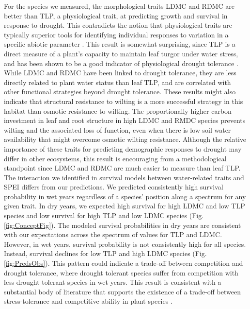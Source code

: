 \documentclass[12pt, letterpaper]{article}
\begin{document}
For the species we measured, the morphological traits LDMC and RDMC are better than TLP, a physiological trait, at predicting growth and survival in response to drought. This contradicts the notion that physiological traits are typically superior tools for identifying individual responses to variation in a specific abiotic parameter \citep{Volaire2018}. This result is somewhat surprising, since TLP is a direct measure of a plant's capacity to maintain leaf turgor under water stress, and has been shown to be a good indicator of physiological drought tolerance \citep{Bartlett2012}. While LDMC and RDMC have been linked to drought tolerance, they are less directly related to plant water status than leaf TLP, and are correlated with other functional strategies beyond drought tolerance. These results might also indicate that structural resistance to wilting is a more successful strategy in this habitat than osmotic resistance to wilting. The proportionally higher carbon investment in leaf and root structure in high LDMC and RMDC species prevents wilting and the associated loss of function, even when there is low soil water availability that might overcome osmotic wilting resistance. Although the relative importance of these traits for predicting demographic responses to drought may differ in other ecosystems, this result is encouraging from a methodological standpoint since LDMC and RDMC are much easier to measure than leaf TLP.
The interaction we identified in survival models between water-related traits and SPEI differs from our predictions. We predicted consistently high survival probability in wet years regardless of a species’ position along a spectrum for any given trait. In dry years, we expected high survival for high LDMC and low TLP species and low survival for high TLP and low LDMC species (Fig. \ref{fig:ConceptFig}). The modeled survival probabilities in dry years are consistent with our expectations across the spectrum of values for TLP and LDMC. However, in wet years, survival probability is not consistently high for all species. Instead, survival declines for low TLP and high LDMC species (Fig. \ref{fig:PredsObs}). This pattern could indicate a trade-off between competition and drought tolerance, where drought tolerant species suffer from competition with less drought tolerant species in wet years. This result is consistent with a substantial body of literature that supports the existence of a trade-off between stress-tolerance and competitive ability in plant species  \citep{Grime1979, Grime1997, Craine2007, Volaire2018}.
\end{document}
